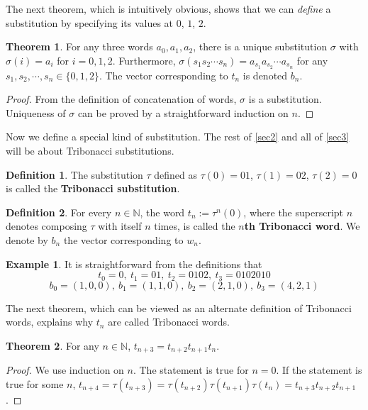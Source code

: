 \documentclass{article}
\theoremstyle{definition}
\newtheorem{theorem}{Theorem}
\newtheorem*{definition}{Definition}
\newtheorem*{example}{Example}
\begin{document}
The next theorem, which is intuitively obvious, shows that we can \textit{define} a substitution by specifying its values at $0$, $1$, $2$.

\begin{theorem}
For any three words $a_0, a_1, a_2$, there is a unique substitution $\sigma$ with $\sigma(i)=a_i$ for $i=0,1,2$. Furthermore, $\sigma(s_1s_2\cdots s_n)=a_{s_1}a_{s_2}\cdots a_{s_n}$ for any $s_1, s_2, \cdots, s_n\in\{0,1,2\}$. The vector corresponding to $t_n$ is denoted $b_n$.
\end{theorem}
\begin{proof}
From the definition of concatenation of words, $\sigma$ is a substitution. Uniqueness of $\sigma$ can be proved by a straightforward induction on $n$.
\end{proof}

Now we define a special kind of substitution. The rest of \cref{sec2} and all of \cref{sec3} will be about Tribonacci substitutions.

\begin{definition}
The substitution $\tau$ defined as $\tau(0)=01$, $\tau(1)=02$, $\tau(2)=0$ is called the \textbf{Tribonacci substitution}.
\end{definition}

\begin{definition}
For every $n\in \mathbb{N}$, the word $t_n:=\tau^n(0)$, where the superscript $n$ denotes composing $\tau$ with itself $n$ times, is called the \textbf{$n$th Tribonacci word}. We denote by $b_n$ the vector corresponding to $w_n$.
\end{definition}
\begin{example}
It is straightforward from the definitions that
\[ t_0=0,  \ t_1=01,\ t_2=0102, \ t_3=0102010\]
\[ b_0=(1, 0, 0),  \ b_1=(1, 1, 0),\ b_2=(2, 1, 0), \ b_3=(4, 2, 1)\]
\end{example}

The next theorem, which can be viewed as an alternate definition of Tribonacci words, explains why $t_n$ are called Tribonacci words.

\begin{theorem}
\label{thm 3}
For any $n\in \mathbb{N}$, $t_{n+3}=t_{n+2}t_{n+1}t_n$.
\end{theorem}
\begin{proof}
We use induction on $n$. The statement is true for $n=0$. If the statement is true for some $n$, $t_{n+4}=\tau(t_{n+3})=\tau(t_{n+2})\tau(t_{n+1})\tau(t_{n})=t_{n+3}t_{n+2}t_{n+1}$.
\end{proof}
\end{document}
